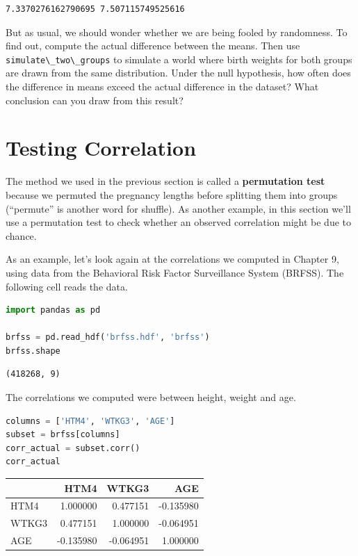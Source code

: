 \begin{lstlisting}[style=output]
7.3370276162790695 7.507115749525616
\end{lstlisting}

But as usual, we should wonder whether we are being fooled by
randomness. To find out, compute the actual difference between the
means. Then use \passthrough{\lstinline!simulate\_two\_groups!} to
simulate a world where birth weights for both groups are drawn from the
same distribution. Under the null hypothesis, how often does the
difference in means exceed the actual difference in the dataset? What
conclusion can you draw from this result?

\hypertarget{testing-correlation}{%
\section{Testing Correlation}\label{testing-correlation}}

The method we used in the previous section is called a
\textbf{permutation test} because we permuted the pregnancy lengths
before splitting them into groups (``permute'' is another word for
shuffle). As another example, in this section we'll use a permutation
test to check whether an observed correlation might be due to chance.

As an example, let's look again at the correlations we computed in
Chapter 9, using data from the Behavioral Risk Factor Surveillance
System (BRFSS). The following cell reads the data.

\begin{lstlisting}[language=Python,style=source]
import pandas as pd

brfss = pd.read_hdf('brfss.hdf', 'brfss')
brfss.shape
\end{lstlisting}

\begin{lstlisting}[style=output]
(418268, 9)
\end{lstlisting}

The correlations we computed were between height, weight and age.

\begin{lstlisting}[language=Python,style=source]
columns = ['HTM4', 'WTKG3', 'AGE']
subset = brfss[columns]
corr_actual = subset.corr()
corr_actual
\end{lstlisting}

\begin{tabular}{lrrr}
\midrule
 & HTM4 & WTKG3 & AGE \\
\midrule
HTM4 & 1.000000 & 0.477151 & -0.135980 \\
WTKG3 & 0.477151 & 1.000000 & -0.064951 \\
AGE & -0.135980 & -0.064951 & 1.000000 \\
\midrule
\end{tabular}

